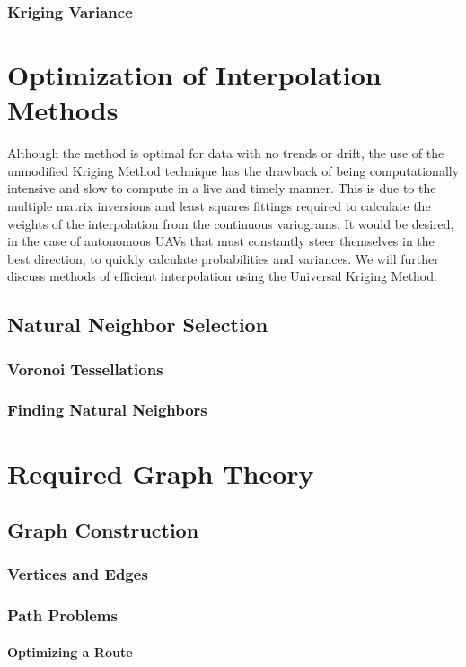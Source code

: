 \documentclass[11pt]{ucthesis}
\begin{document}
\subsection{Kriging Variance}

\chapter{Optimization of Interpolation Methods}
Although the method is optimal for data with no trends or drift, the use of the unmodified Kriging Method technique has the drawback of being computationally intensive and slow to compute in a live and timely manner. This is due to the multiple matrix inversions and least squares fittings required to calculate the weights of the interpolation from the continuous variograms. It would be desired, in the case of autonomous UAVs that must constantly steer themselves in the best direction, to quickly calculate probabilities and variances. We will further discuss methods of efficient interpolation using the Universal Kriging Method.
\section{Natural Neighbor Selection}
\subsection{Voronoi Tessellations}
\subsection{Finding Natural Neighbors}

\chapter{Required Graph Theory}
\section{Graph Construction}
\subsection{Vertices and Edges}
\subsection{Path Problems}
\subsubsection{Optimizing a Route}
\end{document}
